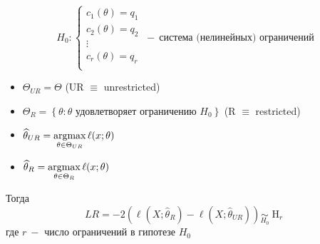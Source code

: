 \documentclass[a4paper,11pt]{article}
\begin{document}
\[H_0:\begin{cases}
    c_1(\theta) = q_1\\
    c_2(\theta) = q_2\\
    \vdots\\
    c_r(\theta) = q_r\\
\end{cases} \ - \  \text{система (нелинейных) ограничений}\]
\begin{itemize}
    \item $\Theta_{UR} = \Theta$ (UR $\equiv$ unrestricted)
    \item $\Theta_{R} = \left\{\theta: \theta \text{ удовлетворяет ограничению } H_0\right\}$ (R $\equiv$ restricted)
    \item $\widehat{\theta}_{UR} = \underset{\theta\in\Theta_{UR}}{\operatorname{argmax}}\,\ell(x;\theta)$
    \item $\widehat{\theta}_{R} = \underset{\theta\in\Theta_{R}}{\operatorname{argmax}}\,\ell(x;\theta)$
\end{itemize}
Тогда
\[LR = -2\left(\ell\left(X;\widehat{\theta}_R\right) - \ell\left(X;\widehat{\theta}_{UR}\right)\right) \underset{H_0}{\sim} \operatorname{H}_r\]
где $r\ -$ число ограничений в гипотезе $H_0$
\end{document}
